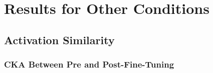 \documentclass{article}
\begin{document}
\newpage

\section{Results for Other Conditions}
\label{appendix:results-for-other-conditions}

\subsection{Activation Similarity}
\label{appendix:results-for-other-conditions-activation-similarity}

\subsubsection{CKA Between Pre and Post-Fine-Tuning}
\label{appendix:results-for-other-conditions-cka-between-pre-and-post-fine-tuning}
\end{document}

